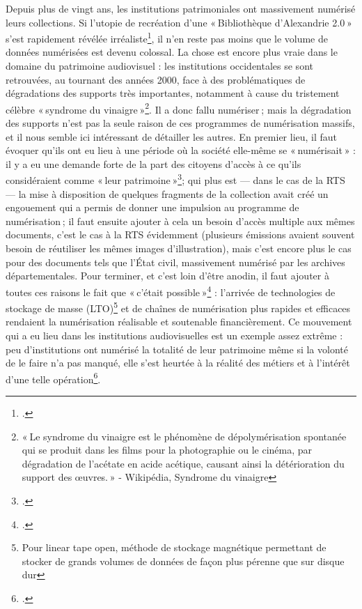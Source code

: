 Depuis plus de vingt ans, les institutions patrimoniales ont massivement numérisé leurs collections. Si l’utopie de recréation d’une « Bibliothèque d’Alexandrie 2.0 » s’est rapidement révélée irréaliste\footcite[p. 20]{bermes2024}, il n’en reste pas moins que le volume de données numérisées est devenu colossal. La chose est encore plus vraie dans le domaine du patrimoine audiovisuel : les institutions occidentales se sont retrouvées, au tournant des années 2000, face à des problématiques de dégradations des supports très importantes, notamment à cause du tristement célèbre « syndrome du vinaigre »\footnote{« Le syndrome du vinaigre est le phénomène de dépolymérisation spontanée qui se produit dans les films pour la photographie ou le cinéma, par dégradation de l’acétate en acide acétique, causant ainsi la détérioration du support des œuvres. » - Wikipédia, Syndrome du vinaigre}. Il a donc fallu numériser ; mais la dégradation des supports n’est pas la seule raison de ces programmes de numérisation massifs, et il nous semble ici intéressant de détailler les autres. En premier lieu, il faut évoquer qu'ils ont eu lieu à une période où la société elle-même se « numérisait » : il y a eu une demande forte de la part des citoyens d’accès à ce qu’ils considéraient comme « leur patrimoine »\footcite{rezzonico2023}; qui plus est — dans le cas de la RTS — la mise à disposition de quelques fragments de la collection avait créé un engouement qui a permis de donner une impulsion au programme de numérisation ; il faut ensuite ajouter à cela un besoin d’accès multiple aux mêmes documents, c’est le cas à la RTS évidemment (plusieurs émissions avaient souvent besoin de réutiliser les mêmes images d’illustration), mais c’est encore plus le cas pour des documents tels que l’État civil, massivement numérisé par les archives départementales. Pour terminer, et c’est loin d’être anodin, il faut ajouter à toutes ces raisons le fait que « c’était possible »\footcite{barcella2024a} : l’arrivée de technologies de stockage de masse (LTO)\footnote{Pour linear tape open, méthode de stockage magnétique permettant de stocker de grands volumes de données de façon plus pérenne que sur disque dur} et de chaînes de numérisation plus rapides et efficaces rendaient la numérisation réalisable et soutenable financièrement. Ce mouvement qui a eu lieu dans les institutions audiovisuelles est un exemple assez extrême : peu d’institutions ont numérisé la totalité de leur patrimoine même si la volonté de le faire n’a pas manqué, elle s’est heurtée à la réalité des métiers et à l’intérêt d’une telle opération\footcite[p. 21]{bermes2024}.

